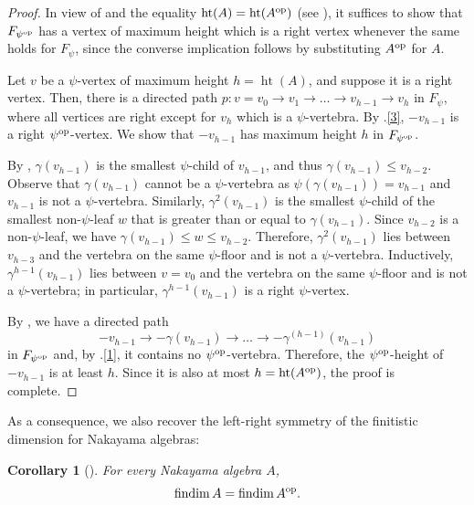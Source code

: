 \documentclass[a4paper]{amsart}
\newtheorem{corollary}[theorem]{Corollary}
\theoremstyle{definition}
\theoremstyle{remark}
\numberwithin{equation}{theorem}
\newcommand{\findim}{\operatorname{findim}}
\newcommand{\height}{\operatorname{ht}}
\newcommand{\psiforest}{F_\psi}
\newcommand{\op}{\textnormal{op}}
\newcommand{\psiop}{\psi^{\op}}
\newcommand{\psiopforest}{F_{\psiop}}
\begin{document}
\begin{proof}
    In view of  and the equality $ \height (A) = \height (A^\op) $ (see \cite[Corollary~2, Appendix A.1]{Ri2}), it suffices to show that $ \psiopforest $ has a vertex of maximum height which is a right vertex whenever the same holds for $ \psiforest $, since the converse implication follows by substituting $A^\op$ for $A$.

    Let $ v $ be a $ \psi $-vertex of maximum height $ h = \height(A) $, and suppose it is a right vertex. Then, there is a directed path $ p : v = v_0 \to v_1 \to \ldots \to v_{h-1} \to v_h $ in $ \psiforest $, where all vertices are right except for $ v_h $ which is a $ \psi $-vertebra.
    By .\eqref{3}, $ -v_{h-1} $ is a right $ \psi^\op $-vertex.
    We show that $ -v_{h-1} $ has maximum height $ h $ in $ \psiopforest $.

    By , $ \gamma(v_{h-1}) $ is the smallest $ \psi $-child of $ v_{h-1} $, and thus $ \gamma(v_{h-1}) \leq v_{h-2} $. Observe that $ \gamma(v_{h-1}) $ cannot be a $ \psi $-vertebra as $ \psi ( \gamma(v_{h-1}) ) = v_{h-1} $ and $ v_{h-1} $ is not a $ \psi $-vertebra. 
    Similarly, $ \gamma^2(v_{h-1}) $ is the smallest $ \psi $-child of the smallest non-$ \psi $-leaf $ w $ that is greater than or equal to $ \gamma(v_{h-1}) $. Since $ v_{h-2} $ is a non-$\psi$-leaf, we have $ \gamma(v_{h-1}) \leq w \leq v_{h-2} $. Therefore, $ \gamma^2(v_{h-1}) $ lies between $ v_{h-3} $ and the vertebra on the same $ \psi $-floor and is not a $ \psi $-vertebra.
    Inductively, $ \gamma^{h-1}(v_{h-1}) $ lies between $ v = v_0 $ and the vertebra on the same $ \psi $-floor and is not a $ \psi $-vertebra; in particular, $ \gamma^{h-1}(v_{h-1}) $ is a right $ \psi $-vertex.

    By , we have a directed path
        \[
            -v_{h-1} \to - \gamma(v_{h-1}) \to \ldots \to - \gamma^{(h-1)}(v_{h-1})
        \]
    in $ \psiopforest $ and, by .\eqref{1}, it contains no $ \psi^\op $-vertebra. Therefore, the $ \psi^\op $-height of $ -v_{h-1} $ is at least $ h $. Since it is also at most $ h = \height(A^\op) $, the proof is complete.
\end{proof}

As a consequence, we also recover the left-right symmetry of the finitistic dimension for Nakayama algebras:

\begin{corollary}[\mbox{\cite[Theorem~A.(vii)]{Se2}}]\label{cor:findim.findimop}
    For every Nakayama algebra $ A $,
        \[
            \findim A = \findim A^\op   .
        \]
\end{corollary}
\end{document}
